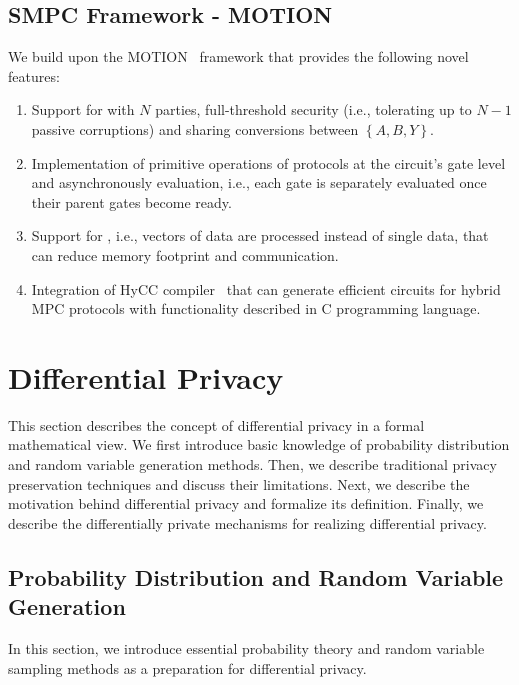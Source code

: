 \subsection{SMPC Framework - MOTION}
\label{subsection:MOTIONFramework}
We build upon the MOTION~\cite{braun2022motion} framework that provides the following novel features:
\begin{enumerate}
    \item Support for \smpc with $N$ parties, full-threshold security (i.e., tolerating up to $N-1$ passive corruptions) and sharing conversions between $\left\{A,B,Y\right\} $.
    \item Implementation of primitive operations of \smpc protocols at the circuit's gate level and asynchronously evaluation, i.e., each gate is separately evaluated once their parent gates become ready.
    \item Support for \simd, i.e., vectors of data are processed instead of single data, that can reduce memory footprint and communication.
    \item Integration of HyCC compiler~\cite{buscher2018hycc} that can generate efficient circuits for hybrid MPC protocols with functionality described in C programming language.
\end{enumerate}


\section{Differential Privacy}
\label{sec:differentialPrivacy}
This section describes the concept of differential privacy in a formal mathematical view. We first introduce basic knowledge of probability distribution and random variable generation methods. Then, we describe traditional privacy preservation techniques and discuss their limitations. Next, we describe the motivation behind differential privacy and formalize its definition. Finally, we describe the differentially private mechanisms for realizing differential privacy.

\subsection{Probability Distribution and Random Variable Generation}
\label{subsec:probabilityDistribution}
In this section, we introduce essential probability theory and random variable sampling methods as a preparation for differential privacy.

